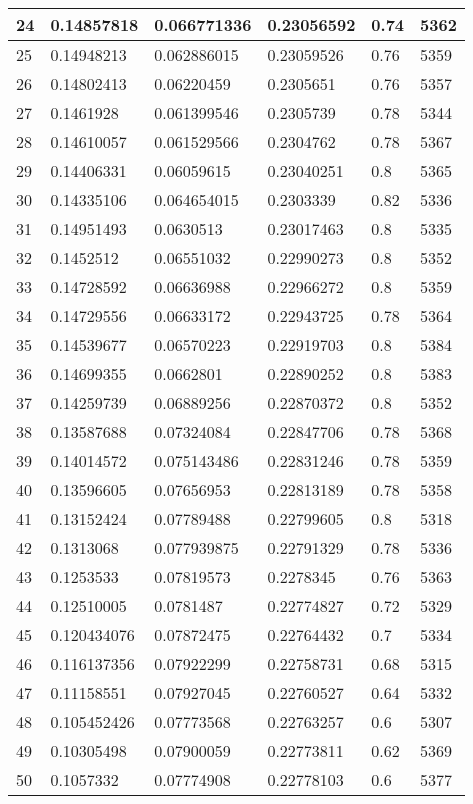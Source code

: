 \begin{longtable}{|l|l|l|l|l|l|}
24 & 0.14857818 & 0.066771336 & 0.23056592 & 0.74 & 5362 \\ \hline 
25 & 0.14948213 & 0.062886015 & 0.23059526 & 0.76 & 5359 \\ \hline 
26 & 0.14802413 & 0.06220459 & 0.2305651 & 0.76 & 5357 \\ \hline 
27 & 0.1461928 & 0.061399546 & 0.2305739 & 0.78 & 5344 \\ \hline 
28 & 0.14610057 & 0.061529566 & 0.2304762 & 0.78 & 5367 \\ \hline 
29 & 0.14406331 & 0.06059615 & 0.23040251 & 0.8 & 5365 \\ \hline 
30 & 0.14335106 & 0.064654015 & 0.2303339 & 0.82 & 5336 \\ \hline 
31 & 0.14951493 & 0.0630513 & 0.23017463 & 0.8 & 5335 \\ \hline 
32 & 0.1452512 & 0.06551032 & 0.22990273 & 0.8 & 5352 \\ \hline 
33 & 0.14728592 & 0.06636988 & 0.22966272 & 0.8 & 5359 \\ \hline 
34 & 0.14729556 & 0.06633172 & 0.22943725 & 0.78 & 5364 \\ \hline 
35 & 0.14539677 & 0.06570223 & 0.22919703 & 0.8 & 5384 \\ \hline 
36 & 0.14699355 & 0.0662801 & 0.22890252 & 0.8 & 5383 \\ \hline 
37 & 0.14259739 & 0.06889256 & 0.22870372 & 0.8 & 5352 \\ \hline 
38 & 0.13587688 & 0.07324084 & 0.22847706 & 0.78 & 5368 \\ \hline 
39 & 0.14014572 & 0.075143486 & 0.22831246 & 0.78 & 5359 \\ \hline 
40 & 0.13596605 & 0.07656953 & 0.22813189 & 0.78 & 5358 \\ \hline 
41 & 0.13152424 & 0.07789488 & 0.22799605 & 0.8 & 5318 \\ \hline 
42 & 0.1313068 & 0.077939875 & 0.22791329 & 0.78 & 5336 \\ \hline 
43 & 0.1253533 & 0.07819573 & 0.2278345 & 0.76 & 5363 \\ \hline 
44 & 0.12510005 & 0.0781487 & 0.22774827 & 0.72 & 5329 \\ \hline 
45 & 0.120434076 & 0.07872475 & 0.22764432 & 0.7 & 5334 \\ \hline 
46 & 0.116137356 & 0.07922299 & 0.22758731 & 0.68 & 5315 \\ \hline 
47 & 0.11158551 & 0.07927045 & 0.22760527 & 0.64 & 5332 \\ \hline 
48 & 0.105452426 & 0.07773568 & 0.22763257 & 0.6 & 5307 \\ \hline 
49 & 0.10305498 & 0.07900059 & 0.22773811 & 0.62 & 5369 \\ \hline 
50 & 0.1057332 & 0.07774908 & 0.22778103 & 0.6 & 5377 \\ \hline 
\end{longtable}